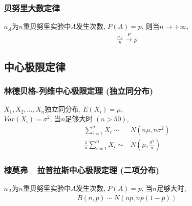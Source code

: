 \subsubsection{贝努里大数定律}
\begin{theorem}
    $n_A$为$n$重贝努里实验中$A$发生次数, $P(A)=p$, 则当$n\rightarrow +\infty$, 
    \begin{align*}
        \frac{n_A}{n}\overset{P}{\longrightarrow}p
    \end{align*}
\end{theorem}

\subsection{中心极限定律}
\subsubsection{林德贝格-列维中心极限定理 (独立同分布)}
\begin{theorem}
    $X_1,X_2,\dots,X_n$独立同分布, $E(X_i)=\mu$,\\  $Var(X_i)=\sigma^2$, 当$n$足够大时 $(n>50)$, 
    \begin{align*}
        \sum_{i=1}^n X_i \sim& N(n\mu,n\sigma^2)\\
        \frac{1}{n}\sum_{i=1}^n X_i \sim& N(\mu,\frac{\sigma^2}{n})
    \end{align*}
\end{theorem}

\subsubsection{棣莫弗—拉普拉斯中心极限定理 (二项分布)}
\begin{theorem}
    $n_A$为$n$重贝努里实验中$A$发生次数, $P(A)=p$, 当$n$足够大时, 
    \begin{align*}
        B(n,p)\sim N\left(np,np(1-p)\right)
    \end{align*}
\end{theorem}